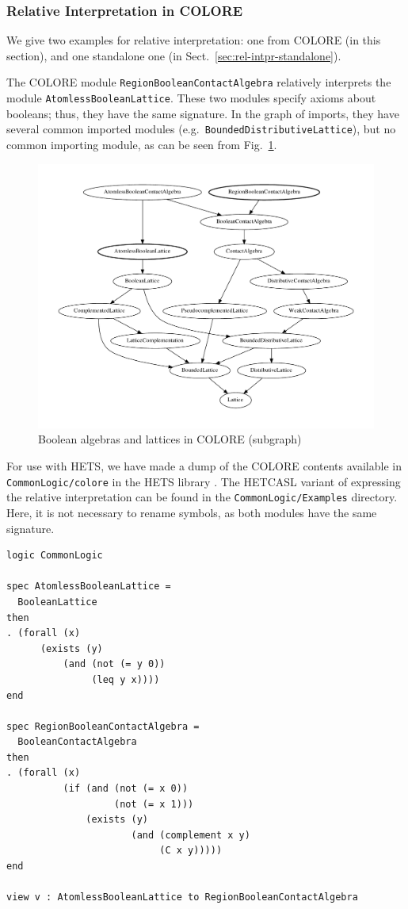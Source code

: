 \documentclass{article}
\newcommand{\normalTEXTSC}[2]{{#1\scriptsize#2}}
\newcommand     {\Hets}{\normalTEXTSC{H}{ETS}\xspace}
\newcommand{\HetCASL}{\normalTEXTSC{H}{ET}\normalTEXTSC{C}{ASL}\xspace}
\begin{document}
\subsubsection{Relative Interpretation in COLORE}\label{sec:relat-interpr}

We give two examples for relative interpretation: one from COLORE (in this section), and one standalone one (in Sect.~\ref{sec:rel-intpr-standalone}).

The COLORE \cite{Colore} module \texttt{Region\-Boolean\-Contact\-Algebra} relatively interprets the module \texttt{Atomless\-Boolean\-Lattice}.  These two modules specify axioms about booleans; thus, they have the same signature.  In the graph of imports, they have several common imported modules (e.g.\ \texttt{Bounded\-Distributive\-Lattice}), but no common importing module, as can be seen from Fig.~\ref{fig:colore-graph}.

\begin{figure}
  \begin{center}
    \includegraphics[width=.75\textwidth]{colore-subset}
  \end{center}
\caption{Boolean algebras and lattices in COLORE (subgraph)}
\label{fig:colore-graph}
\end{figure}

For use with \Hets, we have made a dump of the COLORE contents available in \texttt{CommonLogic/colore} in the \Hets library \cite{hets-library:URL}.  The \HetCASL variant of expressing the relative interpretation can be found in the \texttt{CommonLogic/Examples} directory.  Here, it is not necessary to rename symbols, as both modules have the same signature.

\begin{lstlisting}[language=hetcasl,alsolanguage=clif]
logic CommonLogic

spec AtomlessBooleanLattice =
  BooleanLattice
then
. (forall (x)
	  (exists (y)
		  (and (not (= y 0))
		       (leq y x))))
end

spec RegionBooleanContactAlgebra =
  BooleanContactAlgebra
then
. (forall (x)     
          (if (and (not (= x 0)) 
                   (not (= x 1))) 
              (exists (y)
                      (and (complement x y)
                           (C x y)))))
end

view v : AtomlessBooleanLattice to RegionBooleanContactAlgebra
\end{lstlisting}
\end{document}
